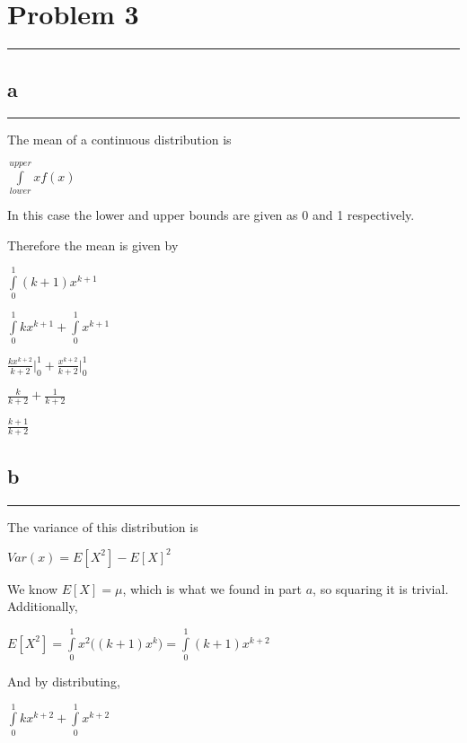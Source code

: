 \documentclass[]{tufte-handout}
\begin{document}
\hypertarget{problem-3}{%
\section{Problem 3}\label{problem-3}}

\begin{center}\rule{0.5\linewidth}{0.5pt}\end{center}

\hypertarget{a-1}{%
\subsection{a}\label{a-1}}

\begin{center}\rule{0.5\linewidth}{0.5pt}\end{center}

The mean of a continuous distribution is

\(\int\limits_{lower}^{upper}xf(x)\)

In this case the lower and upper bounds are given as 0 and 1
respectively.

Therefore the mean is given by

\(\int\limits_{0}^{1}(k+1)x^{k+1}\)

\(\int\limits_{0}^{1}kx^{k+1} + \int\limits_{0}^{1}x^{k+1}\)

\(\frac{kx^{k+2}}{k+2}\Bigg|^1_0 + \frac{x^{k+2}}{k+2}\Bigg|^1_0\)

\(\frac{k}{k+2} + \frac{1}{k+2}\)

\(\frac{k+1}{k+2}\)

\hypertarget{b-1}{%
\subsection{b}\label{b-1}}

\begin{center}\rule{0.5\linewidth}{0.5pt}\end{center}

The variance of this distribution is

\(Var(x) = E[X^2] - E[X]^2\)

We know \(E[X]=\mu\), which is what we found in part \(a\), so squaring
it is trivial. Additionally,

\(E[X^2] = \int\limits_{0}^{1}x^2\big((k+1)x^k\big) = \int\limits_{0}^{1}(k+1)x^{k+2}\)

And by distributing,

\(\int\limits_{0}^{1}kx^{k+2} + \int\limits_{0}^{1}x^{k+2}\)
\end{document}
